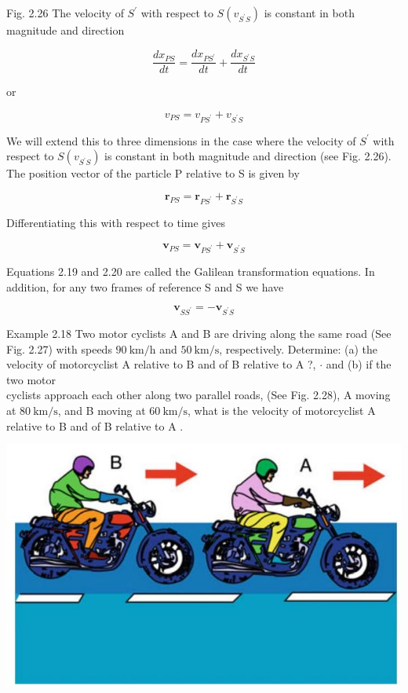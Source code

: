 \documentclass[10pt]{article}
\begin{document}
Fig. 2.26 The velocity of $S^{\prime}$ with respect to $S\left(v_{S^{\prime} S}\right)$ is constant in both magnitude and direction

$$
\frac{d x_{P S}}{d t}=\frac{d x_{P S^{\prime}}}{d t}+\frac{d x_{S^{\prime} S}}{d t}
$$

or

$$
v_{P S}=v_{P S^{\prime}}+v_{S^{\prime} S}
$$

We will extend this to three dimensions in the case where the velocity of $S^{\prime}$ with respect to $S\left(v_{S^{\prime} S}\right)$ is constant in both magnitude and direction (see Fig. 2.26). The position vector of the particle P relative to S is given by


\begin{equation*}
\mathbf{r}_{P S}=\mathbf{r}_{P S^{\prime}}+\mathbf{r}_{S^{\prime} S} \tag{2.19}
\end{equation*}


Differentiating this with respect to time gives


\begin{equation*}
\mathbf{v}_{P S}=\mathbf{v}_{P S^{\prime}}+\mathbf{v}_{S^{\prime} S} \tag{2.20}
\end{equation*}


Equations 2.19 and 2.20 are called the Galilean transformation equations. In addition, for any two frames of reference S and S we have

$$
\mathbf{v}_{S S^{\prime}}=-\mathbf{v}_{S^{\prime} S}
$$

Example 2.18 Two motor cyclists A and B are driving along the same road (See Fig. 2.27) with speeds $90 \mathrm{~km} / \mathrm{h}$ and $50 \mathrm{~km} / \mathrm{s}$, respectively. Determine: (a) the velocity of motorcyclist A relative to B and of B relative to A ?, $\cdot$ and (b) if the two motor\\
cyclists approach each other along two parallel roads, (See Fig. 2.28), A moving at $80 \mathrm{~km} / \mathrm{s}$, and B moving at $60 \mathrm{~km} / \mathrm{s}$, what is the velocity of motorcyclist A relative to B and of B relative to A .

\begin{center}
\includegraphics[max width=\textwidth]{2024_09_13_db1f357d2aad0a03eb2eg-042(2)}
\end{center}
\end{document}
